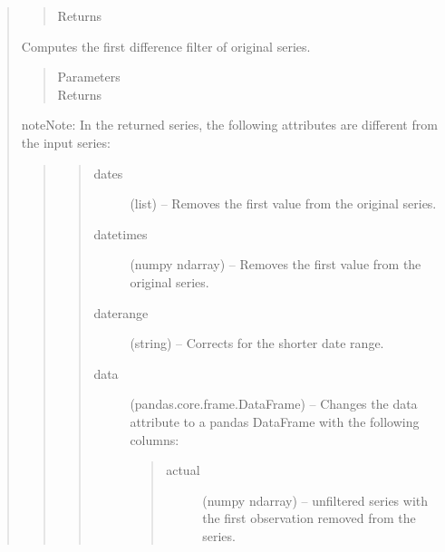 \documentclass[letterpaper,10pt,english]{sphinxmanual}
\begin{document}
\begin{fulllineitems}
\begin{quote}
\begin{fulllineitems}
\begin{quote}
\begin{description}
\item[{Returns}] \leavevmode
{\hyperref[series_class:fredpy.series]{}}

\end{description}\end{quote}

\end{fulllineitems}


\begin{fulllineitems}
\label{series_class:fredpy.series.firstdiff}
Computes the first difference filter of original series.
\begin{quote}\begin{description}
\item[{Parameters}] \leavevmode
\item[{Returns}] \leavevmode
{\hyperref[series_class:fredpy.series]{}}

\end{description}\end{quote}

\begin{notice}{note}{Note:}
In the returned series, the following attributes are different from the input series:
\begin{quote}
\begin{quote}\begin{description}
\item[{dates}] \leavevmode
(list) --  Removes the first value from the original series.

\item[{datetimes}] \leavevmode
(numpy ndarray) --  Removes the first value from the original series.

\item[{daterange}] \leavevmode
(string) -- Corrects for the shorter date range.

\item[{data}] \leavevmode
(pandas.core.frame.DataFrame) --  Changes the data attribute to a pandas DataFrame with the following columns:
\begin{quote}\begin{description}
\item[{actual}] \leavevmode
(numpy ndarray) -- unfiltered series with the first observation removed from the series.


\end{description}
\end{quote}
\end{description}
\end{quote}
\end{quote}
\end{notice}
\end{fulllineitems}
\end{quote}
\end{fulllineitems}
\end{document}

